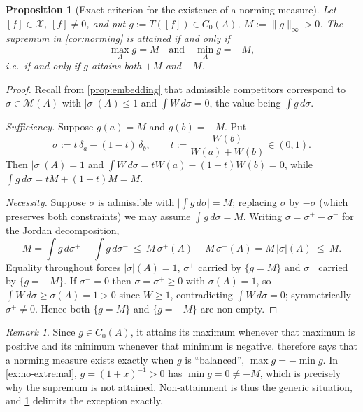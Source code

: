 \documentclass[11pt,a4paper]{article}
\numberwithin{equation}{section}
\theoremstyle{plain}
\newtheorem{proposition}[theorem]{Proposition}
\theoremstyle{definition}
\theoremstyle{remark}
\newtheorem{remark}[theorem]{Remark}
\newcommand{\Cz}{C_0}
\newcommand{\Msp}{\mathcal{M}}
\newcommand{\Xdec}{\mathcal{X}}
\begin{document}
\begin{proposition}[Exact criterion for the existence of a norming measure]
\label{prop:extremal-iff}
Let $[f]\in\Xdec$, $[f]\ne0$, and put $g:=T([f])\in\Cz(A)$, $M:=\|g\|_\infty>0$. The
supremum in \cref{cor:norming} is attained if and only if
\[
\max_A g=M\quad\text{and}\quad\min_A g=-M,
\]
i.e.\ if and only if $g$ attains both $+M$ and $-M$.
\end{proposition}

\begin{proof}
Recall from \cref{prop:embedding} that admissible competitors correspond to
$\sigma\in\Msp(A)$ with $|\sigma|(A)\le1$ and $\int W\,d\sigma=0$, the value being
$\int g\,d\sigma$.

\emph{Sufficiency.} Suppose $g(a)=M$ and $g(b)=-M$. Put
\[
\sigma:=t\,\delta_a-(1-t)\,\delta_b,\qquad t:=\frac{W(b)}{W(a)+W(b)}\in(0,1).
\]
Then $|\sigma|(A)=1$ and $\int W\,d\sigma=tW(a)-(1-t)W(b)=0$, while
$\int g\,d\sigma=tM+(1-t)M=M$.

\emph{Necessity.} Suppose $\sigma$ is admissible with $\bigl|\int g\,d\sigma\bigr|=M$;
replacing $\sigma$ by $-\sigma$ (which preserves both constraints) we may assume
$\int g\,d\sigma=M$. Writing $\sigma=\sigma^{+}-\sigma^{-}$ for the Jordan decomposition,
\[
M=\int g\,d\sigma^{+}-\int g\,d\sigma^{-}\ \le\ M\,\sigma^{+}(A)+M\,\sigma^{-}(A)
=M\,|\sigma|(A)\ \le\ M .
\]
Equality throughout forces $|\sigma|(A)=1$, $\sigma^{+}$ carried by $\{g=M\}$ and
$\sigma^{-}$ carried by $\{g=-M\}$. If $\sigma^{-}=0$ then $\sigma=\sigma^{+}\ge0$ with
$\sigma(A)=1$, so $\int W\,d\sigma\ge\sigma(A)=1>0$ since $W\ge1$, contradicting
$\int W\,d\sigma=0$; symmetrically $\sigma^{+}\ne0$. Hence both $\{g=M\}$ and $\{g=-M\}$
are non-empty.
\end{proof}

\begin{remark}
Since $g\in\Cz(A)$, it attains its maximum whenever that maximum is positive and its
minimum whenever that minimum is negative.  therefore says that a
norming measure exists exactly when $g$ is ``balanced'', $\max g=-\min g$. In
\cref{ex:no-extremal}, $g=(1+x)^{-1}>0$ has $\min g=0\ne-M$, which is precisely why the
supremum is not attained. Non-attainment is thus the generic situation, and
\cref{prop:extremal-iff} delimits the exception exactly.
\end{remark}
\end{document}
